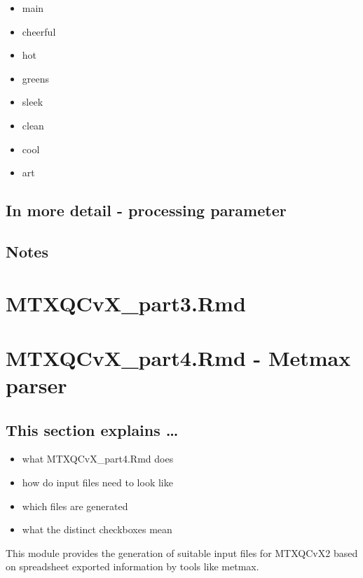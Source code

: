 \documentclass[]{book}
\providecommand{\tightlist}{%
  \setlength{\itemsep}{0pt}\setlength{\parskip}{0pt}}
\theoremstyle{definition}
\theoremstyle{definition}
\theoremstyle{definition}
\theoremstyle{remark}
\begin{document}
\begin{itemize}
  \begin{itemize}
  \tightlist
  \item
    main
  \item
    cheerful
  \item
    hot
  \item
    greens
  \item
    sleek
  \item
    clean
  \item
    cool
  \item
    art
  \end{itemize}
\end{itemize}

\section{In more detail - processing
parameter}\label{in-more-detail---processing-parameter}

\section{Notes}\label{notes}

\chapter{MTXQCvX\_part3.Rmd}\label{part3}

\chapter{MTXQCvX\_part4.Rmd - Metmax parser}\label{Metmax}

\section{This section explains \ldots{}}\label{this-section-explains}

\begin{itemize}
\tightlist
\item
  what MTXQCvX\_part4.Rmd does
\item
  how do input files need to look like
\item
  which files are generated
\item
  what the distinct checkboxes mean
\end{itemize}

This module provides the generation of suitable input files for MTXQCvX2
based on spreadsheet exported information by tools like metmax.
\end{document}
